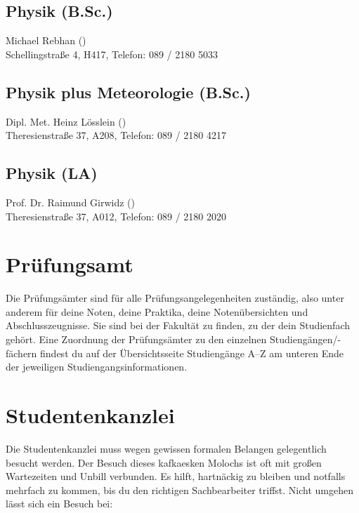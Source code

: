 \subsection*{Physik (B.Sc.)\subjectList{\subjectP}}
Michael Rebhan ()\\
Schellingstraße 4, H417, Telefon: 089 / 2180 \emd{} 5033

\subsection*{Physik plus Meteorologie (B.Sc.)}
Dipl. Met. Heinz Lösslein ()\\
Theresienstraße 37, A208, Telefon: 089 / 2180 \emd{} 4217

\subsection*{Physik (LA)\subjectList{\subjectP}}
Prof. Dr. Raimund Girwidz ()\\
Theresienstraße 37, A012, Telefon: 089 / 2180 \emd{} 2020


\section{Prüfungsamt}
Die Prüfungsämter sind für alle Prüfungsangelegenheiten zuständig,
also unter anderem für deine Noten, deine Praktika, deine Notenübersichten und
Abschlusszeugnisse. Sie sind bei der Fakultät zu finden, zu der
dein Studienfach gehört. Eine Zuordnung der Prüfungsämter zu den
einzelnen Studiengängen/-fächern findest du auf der Übersichtsseite
Studiengänge A--Z am unteren Ende der jeweiligen
Studiengangsinformationen.

\begin{urlList}
\end{urlList}


\section{Studentenkanzlei}

Die Studentenkanzlei muss wegen gewissen formalen Belangen
gelegentlich besucht werden. Der Besuch dieses kafkaesken Molochs ist
oft mit großen Wartezeiten und Unbill verbunden. Es hilft, hartnäckig
zu bleiben und notfalls mehrfach zu kommen, bis du den richtigen
Sachbearbeiter triffst. Nicht umgehen lässt sich ein Besuch bei:

